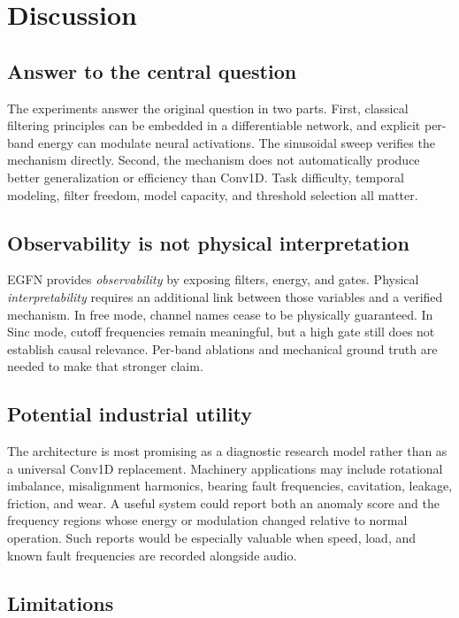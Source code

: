 \documentclass[10pt,twocolumn]{article}
\newcommand{\egfn}{EGFN}
\begin{document}
\section{Discussion}

\subsection{Answer to the central question}

The experiments answer the original question in two parts. First, classical
filtering principles can be embedded in a differentiable network, and explicit
per-band energy can modulate neural activations. The sinusoidal sweep verifies
the mechanism directly. Second, the mechanism does not automatically produce
better generalization or efficiency than Conv1D. Task difficulty, temporal
modeling, filter freedom, model capacity, and threshold selection all matter.

\subsection{Observability is not physical interpretation}

\egfn{} provides \emph{observability} by exposing filters, energy, and gates.
Physical \emph{interpretability} requires an additional link between those
variables and a verified mechanism. In free mode, channel names cease to be
physically guaranteed. In Sinc mode, cutoff frequencies remain meaningful, but
a high gate still does not establish causal relevance. Per-band ablations and
mechanical ground truth are needed to make that stronger claim.

\subsection{Potential industrial utility}

The architecture is most promising as a diagnostic research model rather than
as a universal Conv1D replacement. Machinery applications may include
rotational imbalance, misalignment harmonics, bearing fault frequencies,
cavitation, leakage, friction, and wear. A useful system could report both an
anomaly score and the frequency regions whose energy or modulation changed
relative to normal operation. Such reports would be especially valuable when
speed, load, and known fault frequencies are recorded alongside audio.

\subsection{Limitations}
\end{document}
